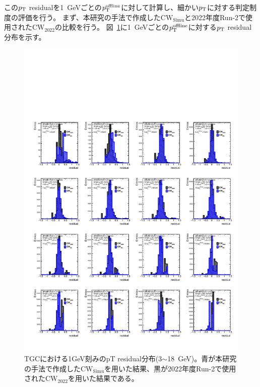 この$p_{\rm{T}}$ residualを1~GeVごとの$p_{\rm{T}}^{\rm{offline}}$に対して計算し、細かい$p_{\rm{T}}$に対する判定制度の評価を行う。
まず、本研究の手法で作成した$\mathrm{CW_{Simu}}$と2022年度Run-2で使用された$\mathrm{CW_{2022}}$の比較を行う。
図~\ref{residual_MC_3_18}に1~GeVごとの$p_{\rm{T}}^{\rm{offline}}$に対する$p_{\rm{T}}$ residual分布を示す。
\begin{figure}[htbp]
  \centering
  \hspace*{-1cm}
  \includegraphics[clip, width=16cm]{fig/5/residual_MC_3_18_re.pdf}
  \caption{TGCにおける1GeV刻みのpT residual分布(3$\sim$18~GeV)。青が本研究の手法で作成した$\mathrm{CW_{Simu}}$を用いた結果、黒が2022年度Run-2で使用された$\mathrm{CW_{2022}}$を用いた結果である。}
  \label{residual_MC_3_18}
\end{figure}
